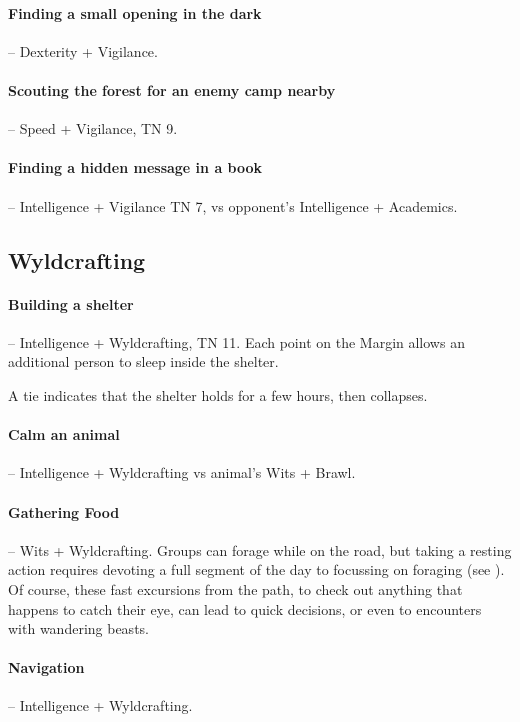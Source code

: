 \begin{multicols}{2}
\paragraph{Finding a small opening in the dark} -- Dexterity + Vigilance.

\paragraph{Scouting the forest for an enemy camp nearby} -- Speed + Vigilance, TN 9.

\paragraph{Finding a hidden message in a book} -- Intelligence + Vigilance TN 7, vs opponent's Intelligence + Academics.

\subsection{Wyldcrafting}

\paragraph{Building a shelter} -- Intelligence + Wyldcrafting, TN 11.
Each point on the Margin allows an additional person to sleep inside the shelter.

A tie indicates that the shelter holds for a few hours, then collapses.

\paragraph{Calm an animal} -- Intelligence + Wyldcrafting vs animal's Wits + Brawl.

\paragraph{Gathering Food} -- Wits + Wyldcrafting.
Groups can forage while on the road, but taking a resting action requires devoting a full segment of the day to focussing on foraging (see ).
Of course, these fast excursions from the path, to check out anything that happens to catch their eye, can lead to quick decisions, or even to encounters with wandering beasts.

\paragraph{Navigation} -- Intelligence + Wyldcrafting.
\label{marching}
\begin{itemize}


\end{itemize}
\end{multicols}
